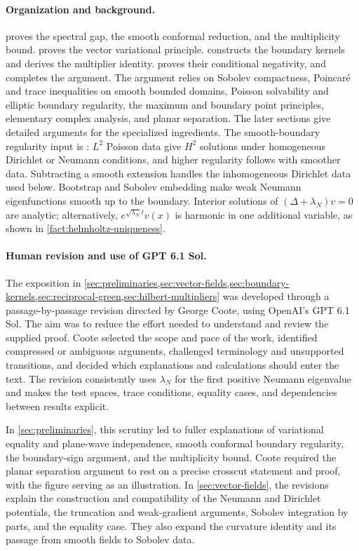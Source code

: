 \paragraph{Organization and background.}
 proves the spectral gap, the smooth conformal
reduction, and the multiplicity bound.  proves
the vector variational principle.  constructs
the boundary kernels and derives the multiplier identity.
 proves their conditional negativity, and
 completes the argument.
The argument relies on Sobolev compactness, Poincar\'e and trace inequalities on smooth
bounded domains, Poisson solvability and elliptic boundary regularity,
the maximum and boundary point principles, elementary complex analysis,
and planar separation. The later sections give detailed arguments for
the specialized ingredients.
The smooth-boundary regularity input is
\cite[Chapter III, Theorems 6.1, 6.4 and 6.5]{Showalter}: $L^2$ Poisson
data give $H^2$ solutions under homogeneous Dirichlet or Neumann
conditions, and higher regularity follows with smoother data.
Subtracting a smooth extension handles the inhomogeneous Dirichlet data
used below. Bootstrap and Sobolev embedding make weak Neumann
eigenfunctions smooth up to the boundary. Interior solutions of
$(\Delta+\lambda_N)v=0$ are analytic; alternatively,
$e^{\sqrt{\lambda_N}t}v(x)$ is harmonic in one additional variable,
as shown in \cref{fact:helmholtz-uniqueness}.

\paragraph{Human revision and use of GPT 6.1 Sol.}
The exposition in \cref{sec:preliminaries,sec:vector-fields,sec:boundary-kernels,sec:reciprocal-green,sec:hilbert-multipliers}
was developed through a passage-by-passage revision directed by George
Coote, using OpenAI's GPT 6.1 Sol. The aim was to reduce the effort
needed to understand and review the supplied proof. Coote
selected the scope and pace of the work, identified compressed or
ambiguous arguments, challenged terminology and unsupported transitions,
and decided which explanations and calculations should enter the text.
The revision consistently uses $\lambda_N$ for the first positive
Neumann eigenvalue and makes the test spaces, trace conditions, equality
cases, and dependencies between results explicit.

In \cref{sec:preliminaries}, this scrutiny led to fuller explanations of
variational equality and plane-wave independence, smooth conformal
boundary regularity, the boundary-sign argument, and the multiplicity
bound. Coote required the planar separation argument to rest
on a precise crosscut statement and proof, with the figure serving as an
illustration. In \cref{sec:vector-fields}, the revisions explain the
construction and compatibility of the Neumann and Dirichlet potentials,
the truncation and weak-gradient arguments, Sobolev integration by parts,
and the equality case. They also expand the curvature identity and its
passage from smooth fields to Sobolev data.

